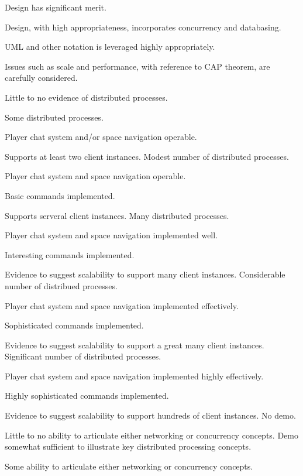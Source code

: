 \documentclass{../../fal_assignment}
\begin{document}
\begin{markingrubric}
        \grade 		Design has significant merit.
            \par 		Design, with high appropriateness, incorporates concurrency and databasing.  
          \par 		UML and other notation is leveraged highly appropriately.
            \par 		Issues such as scale and performance, with reference to CAP theorem, are carefully considered.

%
        \grade\fail Little to no evidence of distributed processes.

        \grade Some distributed processes.
	\par  Player chat system and/or space navigation operable.
	\par  Supports at least two client instances.
        \grade Modest number of distributed processes.
	\par  Player chat system and space navigation operable.
	\par  Basic commands implemented.
	\par  Supports serveral client instances.
        \grade Many distributed processes.
	\par  Player chat system and space navigation implemented well.
	\par  Interesting commands implemented.
	\par  Evidence to suggest scalability to support many client instances.
        \grade Considerable number of distribued processes.
	\par  Player chat system and space navigation implemented effectively.
	\par  Sophisticated commands implemented.
	\par  Evidence to suggest scalability to support a great many client instances.
        \grade Significant number of distributed processes.
	\par  Player chat system and space navigation implemented highly effectively.
	\par  Highly sophisticated commands implemented.
	\par  Evidence to suggest scalability to support hundreds of client instances.
%
        \grade\fail No demo.
            \par Little to no ability to articulate either networking or concurrency concepts.
        \grade Demo somewhat sufficient to illustrate key distributed processing concepts.
            \par Some ability to articulate either networking or concurrency concepts.

\end{markingrubric}
\end{document}
